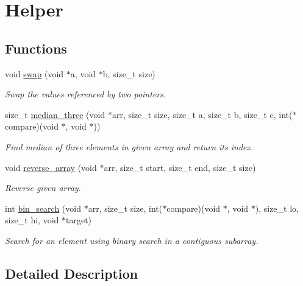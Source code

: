 \hypertarget{group__Helper}{}\section{Helper}
\label{group__Helper}
\subsection*{Functions}
\begin{DoxyCompactItemize}
\item 
void \hyperlink{group__Helper_gac005eaa05ec80dbf1a0984d3d4fa80a8}{swap} (void $\ast$a, void $\ast$b, size\+\_\+t size)
\begin{DoxyCompactList}\small\item\em Swap the values referenced by two pointers. \end{DoxyCompactList}\item 
size\+\_\+t \hyperlink{group__Helper_ga64dc225cd385660f0c413520416e8d40}{median\+\_\+three} (void $\ast$arr, size\+\_\+t size, size\+\_\+t a, size\+\_\+t b, size\+\_\+t c, int($\ast$compare)(void $\ast$, void $\ast$))
\begin{DoxyCompactList}\small\item\em Find median of three elements in given array and return its index. \end{DoxyCompactList}\item 
void \hyperlink{group__Helper_gae26181b67ffd4261a676f39624c3ce68}{reverse\+\_\+array} (void $\ast$arr, size\+\_\+t start, size\+\_\+t end, size\+\_\+t size)
\begin{DoxyCompactList}\small\item\em Reverse given array. \end{DoxyCompactList}\item 
int \hyperlink{group__Helper_ga5f3f53398f1206d95119c4ba54faab58}{bin\+\_\+search} (void $\ast$arr, size\+\_\+t size, int($\ast$compare)(void $\ast$, void $\ast$), size\+\_\+t lo, size\+\_\+t hi, void $\ast$target)
\begin{DoxyCompactList}\small\item\em Search for an element using binary search in a contiguous subarray. \end{DoxyCompactList}\end{DoxyCompactItemize}


\subsection{Detailed Description}



